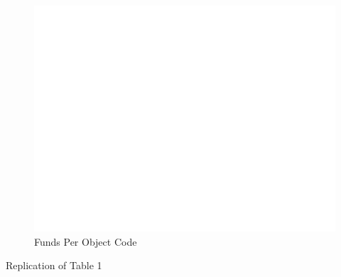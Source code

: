 \documentclass{article}
\begin{document}
\begin{figure}[h]
    \centering
    \includegraphics{../data/manual/histogram_code_count.png}
    \caption{Funds Per Object Code}
    \label{fig:image3}
\end{figure}

\begin{table}[ht]
    \centering
    \caption*{Replication of Table 1}
    \label{tab:table_complete}
      
\end{table}
    
\end{document}
